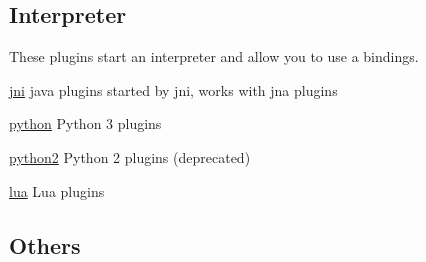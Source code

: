 \subsection*{Interpreter}

These plugins start an interpreter and allow you to use a bindings.


\begin{DoxyItemize}
\item \hyperlink{md_src_plugins_jni_README_src_plugins_jni_README_md}{jni} java plugins started by jni, works with jna plugins
\item \hyperlink{md_src_plugins_python_README_src_plugins_python_README_md}{python} Python 3 plugins
\item \hyperlink{md_src_plugins_python2_README_src_plugins_python2_README_md}{python2} Python 2 plugins (deprecated)
\item \hyperlink{md_src_plugins_lua_README_src_plugins_lua_README_md}{lua} Lua plugins
\end{DoxyItemize}

\subsection*{Others}


